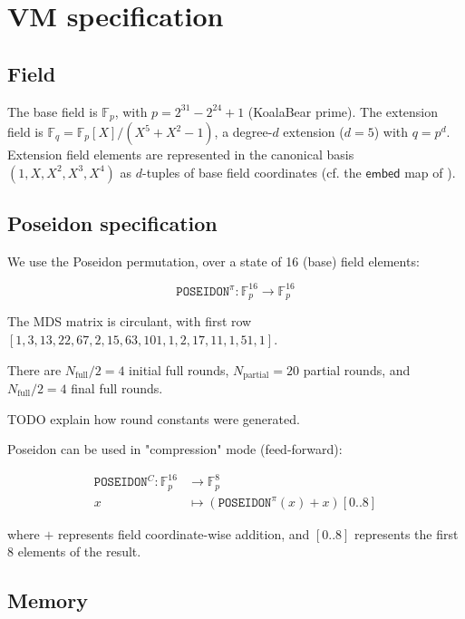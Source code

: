 \documentclass{article}
\theoremstyle{definition}
\newcommand{\Fp}{\mathbb F_p}
\newcommand{\Fq}{\mathbb F_q}
\newcommand{\extdeg}{d} %
\begin{document}
\section{VM specification}
\subsection{Field}\label{sec:field}

The base field is $\Fp$, with $p = 2^{31} - 2^{24} + 1$ (KoalaBear prime). The extension field is $\Fq = \Fp[X] / (X^5 + X^2 - 1)$, a degree-$\extdeg$ extension ($\extdeg = 5$) with $q = p^\extdeg$. Extension field elements are represented in the canonical basis $(1, X, X^2, X^3, X^4)$ as $\extdeg$-tuples of base field coordinates (cf. the $\mathsf{embed}$ map of ).


\subsection{Poseidon specification}

We use the Poseidon \cite{poseidon1} permutation, over a state of 16 (base) field elements: 

$$\texttt{POSEIDON}^\pi: \Fp^{16} \to \Fp^{16}$$

The MDS matrix is circulant, with first row $[1, 3, 13, 22, 67, 2, 15, 63, 101, 1, 2, 17, 11, 1, 51, 1]$.

There are $N_\text{full} / 2 = 4$ initial full rounds, $N_\text{partial} = 20$ partial rounds, and $N_\text{full} / 2 = 4$ final full rounds.

TODO explain how round constants were generated.

\vspace{3mm}

Poseidon can be used in "compression" mode (feed-forward):

\begin{align*}
\texttt{POSEIDON}^C: \Fp^{16} &\to \Fp^{8} \\
x &\mapsto (\texttt{POSEIDON}^\pi(x) + x)[0..8]
\end{align*}

where $+$ represents field coordinate-wise addition, and $[0..8]$ represents the first 8 elements of the result.


\subsection{Memory}\label{sec:memory}
\end{document}
